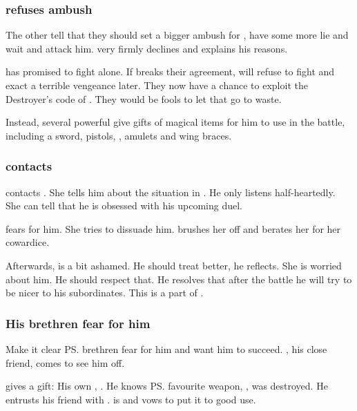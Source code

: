 \subsubsection{\Teshrial refuses ambush}
The other \resphain tell \Teshrial that they should set a bigger ambush for \Ishnaruchaefir, have some more \resphain lie and wait and attack him. 
\Teshrial very firmly declines and explains his reasons.

\Ishnaruchaefir has promised to fight \Teshrial alone.
If \Teshrial breaks their agreement, \Ishnaruchaefir will refuse to fight and exact a terrible vengeance later. 
They now have a chance to exploit the Destroyer's code of \honour. 
They would be fools to let that go to waste. 

Instead, several powerful \resphain give \Teshrial gifts of magical items for him to use in the battle, including a sword, pistols, \armour, amulets and wing braces.





\subsubsection{\Achsah contacts \Teshrial}
\Achsah contacts \Teshrial. 
She tells him about the situation in \Forclin.
He only listens half-heartedly.
She can tell that he is obsessed with his upcoming duel. 

\Achsah fears for him. 
She tries to dissuade him. 
\Teshrial brushes her off and berates her for her cowardice.

Afterwards, \Teshrial is a bit ashamed. 
He should treat \Achsah better, he reflects. 
She is worried about him.
He should respect that.
He resolves that after the battle he will try to be nicer to his \bezed subordinates.
This is a part of . 




\subsubsection{His brethren fear for him}
Make it clear \ps{\Teshrial} brethren fear for him and want him to succeed. 
\Menessiaraid, his close friend, comes to see him off. 

\Menessiaraid{} gives \Teshrial{} a gift: 
His own \senaan, . 
He knows \ps{\Teshrial} favourite weapon, , was destroyed. 
He entrusts his friend with \Ossiraith. 
\Teshrial{} is \honoured and vows to put it to good use. 

